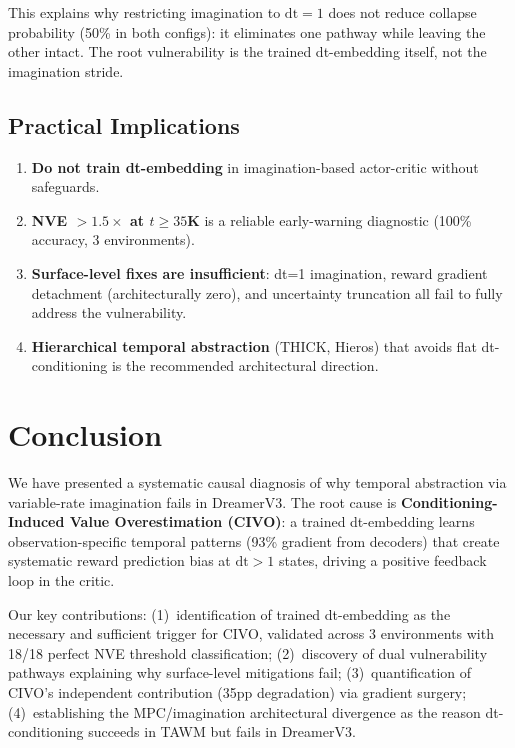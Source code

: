 \documentclass[10pt,letterpaper]{article}
\begin{document}
This explains why restricting imagination to $\mathrm{dt}=1$ does not reduce collapse probability (50\% in both configs): it eliminates one pathway while leaving the other intact.
The root vulnerability is the trained dt-embedding itself, not the imagination stride.

\subsection{Practical Implications}

\begin{enumerate}
    \item \textbf{Do not train dt-embedding} in imagination-based actor-critic without safeguards.
    \item \textbf{NVE $>1.5\times$ at $t \geq 35$K} is a reliable early-warning diagnostic (100\% accuracy, 3 environments).
    \item \textbf{Surface-level fixes are insufficient}: dt=1 imagination, reward gradient detachment (architecturally zero), and uncertainty truncation all fail to fully address the vulnerability.
    \item \textbf{Hierarchical temporal abstraction} (THICK, Hieros) that avoids flat dt-conditioning is the recommended architectural direction.
\end{enumerate}

\section{Conclusion}

We have presented a systematic causal diagnosis of why temporal abstraction via variable-rate imagination fails in DreamerV3.
The root cause is \textbf{Conditioning-Induced Value Overestimation (CIVO)}: a trained dt-embedding learns observation-specific temporal patterns (93\% gradient from decoders) that create systematic reward prediction bias at $\mathrm{dt}>1$ states, driving a positive feedback loop in the critic.

Our key contributions:
(1)~identification of trained dt-embedding as the necessary and sufficient trigger for CIVO, validated across 3 environments with 18/18 perfect NVE threshold classification;
(2)~discovery of dual vulnerability pathways explaining why surface-level mitigations fail;
(3)~quantification of CIVO's independent contribution (35pp degradation) via gradient surgery;
(4)~establishing the MPC/imagination architectural divergence as the reason dt-conditioning succeeds in TAWM but fails in DreamerV3.
\end{document}
